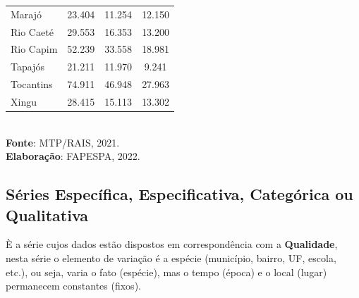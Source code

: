 \begin{table}[!htb]
{\begin{tabular}{l|c|c|c}
Marajó                     &  23.404                                    &  11.254                       &   12.150                           \\
Rio Caeté                  &  29.553                                    &  16.353                       &   13.200                           \\
Rio Capim                  &  52.239                                    &  33.558                       &   18.981                           \\
Tapajós                    &  21.211                                    &  11.970                       &   9.241                           \\
Tocantins                  &  74.911                                    &  46.948                       &   27.963                           \\
Xingu                      &  28.415                                    &  15.113                       &   13.302                           \\ \hline\hline
\end{tabular}}
\\ 
\hspace{-6.9cm}
\textbf{Fonte}: MTP/RAIS, 2021. \\
\hspace{-6.2cm}
\textbf{Elaboração}: FAPESPA, 2022.
\end{table}





















\newpage
\subsection{Séries Específica, Especificativa, Categórica ou Qualitativa}

\inic È a série cujos dados estão dispostos em correspondência com a \textbf{Qualidade}, nesta série o elemento de variação é a espécie (município, bairro, UF, escola, etc.), ou seja, varia o fato (espécie), mas o tempo (época) e o local (lugar) permanecem constantes (fixos).


